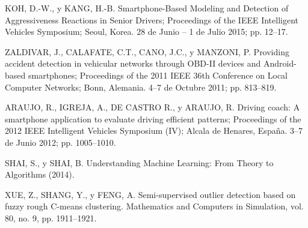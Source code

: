 \begin{thebibliography}{19}
KOH, D.-W., y KANG, H.-B. Smartphone-Based Modeling and Detection of Aggressiveness Reactions in Senior Drivers; Proceedings of the IEEE Intelligent Vehicles Symposium; Seoul, Korea. 28 de Junio – 1 de Julio 2015; pp. 12–17.

ZALDIVAR, J., CALAFATE, C.T., CANO, J.C., y MANZONI, P. Providing accident detection in vehicular networks through OBD-II devices and Android-based smartphones; Proceedings of the 2011 IEEE 36th Conference on Local Computer Networks; Bonn, Alemania. 4–7 de Octubre 2011; pp. 813–819.

ARAUJO, R., IGREJA, A., DE CASTRO R., y ARAUJO, R. Driving coach: A smartphone application to evaluate driving efficient patterns; Proceedings of the 2012 IEEE Intelligent Vehicles Symposium (IV); Alcala de Henares, Espa\~{n}a. 3–7 de Junio 2012; pp. 1005–1010.

SHAI, S., y SHAI, B. Understanding Machine Learning: From Theory to Algorithms (2014).

XUE, Z., SHANG, Y., y FENG, A. Semi-supervised outlier detection based on fuzzy rough C-means clustering. Mathematics and Computers in Simulation, vol. 80, no. 9, pp. 1911–1921.

\end{thebibliography} 

